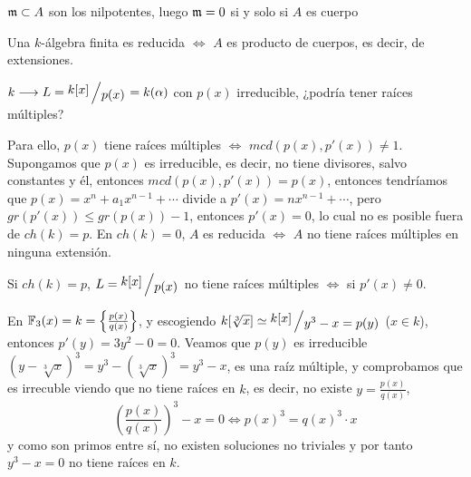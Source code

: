 \begin{dem}
    $\mathfrak{m} \subset A$ son los nilpotentes, luego $\mathfrak{m} = 0 $ si y solo si $A$ es cuerpo
\end{dem}
\begin{cor}
    Una $k$-\'algebra finita es reducida $\iff$ $A$ es producto de cuerpos, es decir, de extensiones. 
\end{cor}
\begin{obs}
    $k \longrightarrow L = \modulo{k[x]}{p(x)} = k(\alpha)$ con $p(x)$ irreducible, ¿podr\'ia tener ra\'ices m\'ultiples?
    
    Para ello, $p(x)$ tiene ra\'ices m\'ultiples $\iff$ $mcd(p(x),p'(x))\neq 1$. Supongamos que $p(x)$ es irreducible, es decir, no tiene divisores, salvo constantes y \'el, entonces $mcd(p(x),p'(x)) = p(x)$, entonces tendr\'iamos que $p(x) = x^n +a_1 x^{n-1} + \cdots $ divide a $p'(x) = n x^{n-1} + \cdots $, pero $gr(p'(x)) \leq gr(p(x))-1$, entonces $p'(x)=0$, lo cual no es posible fuera de $ch(k)=p$. En $ch(k)=0$, $A$ es reducida $\iff$ $A$ no tiene ra\'ices m\'ultiples en ninguna extensi\'on. 

    Si $ch(k) = p$, $L=\modulo{k[x]}{p(x)}$ no tiene ra\'ices m\'ultiples $\iff$ si $p'(x) \neq 0$. 
\end{obs}
\begin{ejem}
    En $\mathbb{F}_3(x) = k = \left\{ \frac{p(x)}{q(x)} \right\}$, y escogiendo $k[\sqrt[3]{x}] \simeq \modulo{k[x]}{y^3-x = p(y)}$ ($x\in k$), entonces $p'(y) = 3y^2-0=0$. Veamos que $p(y)$ es irreducible $(y - \sqrt[3]{x})^3 = y^3 - (\sqrt[3]{x})^3 = y^3-x$, es una ra\'iz m\'ultiple, y comprobamos que es irrecuble viendo que no tiene ra\'ices en $k$, es decir, no existe $y=\frac{p(x)}{q(x)}$, 
    $$\left( \frac{p(x)}{q(x)} \right)^3 - x = 0 \iff p(x)^3 = q(x)^3\cdot x$$
    y como son primos entre s\'i, no existen soluciones no triviales y por tanto $y^3-x=0$ no tiene ra\'ices en $k$. 
\end{ejem}
